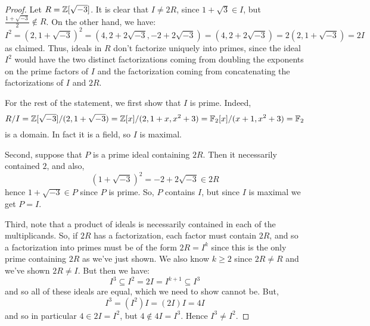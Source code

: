 \begin{proof}
    Let $R = \mathbb{Z}[\sqrt{-3}]$. It is clear that $I \neq 2R$, since $1+\sqrt{3} \in I$, but $\frac{1+\sqrt{-3}}{2} \notin R$. On the other hand, we have:
    \[ I^2 = (2,1+\sqrt{-3})^2 = (4,2+2\sqrt{-3},-2+2\sqrt{-3}) = (4,2+2\sqrt{-3}) = 2(2,1+\sqrt{-3}) = 2I \]
    as claimed. Thus, ideals in $R$ don't factorize uniquely into primes, since the ideal $I^2$ would have the two distinct factorizations coming from doubling the exponents on the prime factors of $I$ and the factorization coming from concatenating the factorizations of $I$ and $2R$.

    For the rest of the statement, we first show that $I$ is prime. Indeed,
    \[ R/I = \mathbb{Z}[\sqrt{-3}]/(2,1+\sqrt{-3}) = \mathbb{Z}[x]/(2,1+x,x^2+3) = \mathbb{F}_2[x]/(x+1,x^2+3) = \mathbb{F}_2 \]
    is a domain. In fact it is a field, so $I$ is maximal.
    
    Second, suppose that $P$ is a prime ideal containing $2R$. Then it necessarily contained $2$, and also,
    \[ (1+\sqrt{-3})^2 = -2+2\sqrt{-3} \in 2R \]
    hence $1+\sqrt{-3} \in P$ since $P$ is prime. So, $P$ contains $I$, but since $I$ is maximal we get $P = I$.
    
    Third, note that a product of ideals is necessarily contained in each of the multiplicands. So, if $2R$ has a factorization, each factor must contain $2R$, and so a factorization into primes must be of the form $2R = I^k$ since this is the only prime containing $2R$ as we've just shown. We also know $k \geq 2$ since $2R \neq R$ and we've shown $2R \neq I$. But then we have:
    \[ I^3 \subseteq I^2 = 2I = I^{k+1} \subseteq I^3 \]
    and so all of these ideals are equal, which we need to show cannot be. But,
    \[ I^3 = (I^2)I = (2I)I = 4I \]
    and so in particular $4 \in 2I = I^2$, but $4 \notin 4I = I^3$. Hence $I^3 \neq I^2$.
\end{proof}
